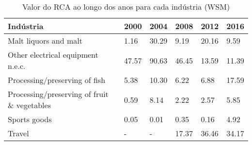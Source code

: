 \begin{table}
\centering
\caption{Valor do RCA ao longo dos anos para cada indústria (WSM)}
\begin{tabular}{p{6cm}p{1.5cm}p{1.5cm}p{1.5cm}p{1.5cm}p{1.5cm}}
\toprule
                                  Indústria &  2000 &  2004 &  2008 &  2012 &  2016 \\
\midrule
                      Malt liquors and malt &  1.16 & 30.29 &  9.19 & 20.16 &  9.59 \\
          Other electrical equipment n.e.c. & 47.57 & 90.63 & 46.45 & 13.59 & 11.39 \\
              Processing/preserving of fish &  5.38 & 10.30 &  6.22 &  6.88 & 17.59 \\
Processing/preserving of fruit \& vegetables &  0.59 &  8.14 &  2.22 &  2.57 &  5.85 \\
                               Sports goods &  0.05 &  0.01 &  0.35 &  0.16 &  4.92 \\
                                     Travel &     - &     - & 17.37 & 36.46 & 34.17 \\
\bottomrule
\end{tabular}
\end{table}
